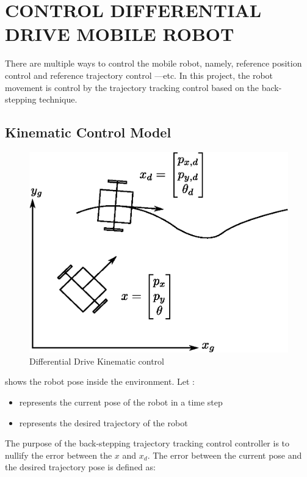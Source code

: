 \section{CONTROL DIFFERENTIAL DRIVE MOBILE ROBOT}
\hspace{1.27cm}
There are multiple ways to control the mobile robot, namely, reference position control and reference trajectory control —etc. In this project, the robot movement is control by the trajectory tracking control based on the back-stepping technique.\par
\subsection{Kinematic Control Model}

\hspace{1.27cm}
\begin{figure}[ht]
	\centering
	\includegraphics[scale=1]{images/imagess/5cont-kinematic.eps} 
	\caption{Differential Drive Kinematic control}
	\label{fig:Differential Drive Kinematic control}
\end{figure}

\textbf{\figureautorefname{ \ref{fig:Differential Drive Kinematic control}}} shows the robot pose inside the environment. Let :
\begin{itemize}
	\item { represents the current pose of the robot in a time step}
	\item { represents the desired trajectory of the robot}
	
\end{itemize}
The purpose of the back-stepping trajectory tracking control controller is to nullify the error between the \(x\) and \(x_d\). The error between the current pose and the desired trajectory pose is defined as:

